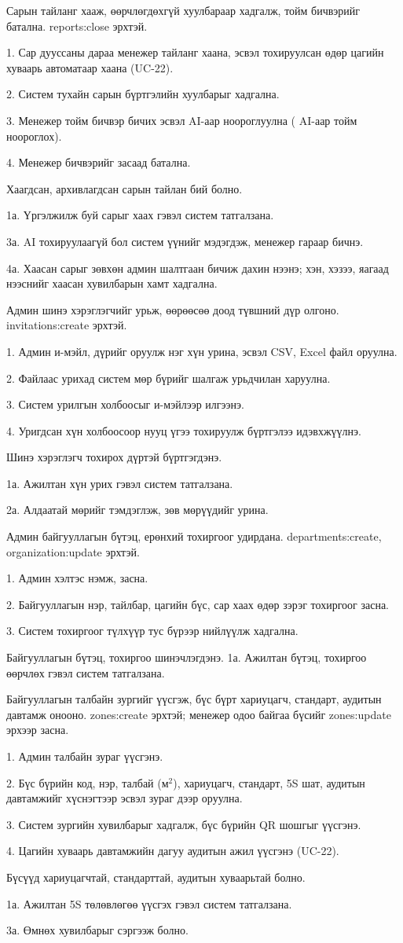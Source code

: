 {Сарын тайланг хааж, өөрчлөгдөхгүй хуулбараар хадгалж, тойм бичвэрийг батална.}
{reports:close эрхтэй.}
{1. Сар дууссаны дараа менежер тайланг хаана, эсвэл тохируулсан өдөр цагийн хуваарь автоматаар хаана (UC-22).\par
 2. Систем тухайн сарын бүртгэлийн хуулбарыг хадгална.\par
 3. Менежер тойм бичвэр бичих эсвэл AI-аар ноороглуулна ( AI-аар тойм ноороглох).\par
 4. Менежер бичвэрийг засаад батална.}
{Хаагдсан, архивлагдсан сарын тайлан бий болно.}
{1а. Үргэлжилж буй сарыг хаах гэвэл систем татгалзана.\par
 3а. AI тохируулаагүй бол систем үүнийг мэдэгдэж, менежер гараар бичнэ.\par
 4а. Хаасан сарыг зөвхөн админ шалтгаан бичиж дахин нээнэ; хэн, хэзээ, яагаад нээснийг хаасан хувилбарын хамт хадгална.}

{Админ шинэ хэрэглэгчийг урьж, өөрөөсөө доод түвшний дүр олгоно.}
{invitations:create эрхтэй.}
{1. Админ и-мэйл, дүрийг оруулж нэг хүн урина, эсвэл CSV, Excel файл оруулна.\par
 2. Файлаас урихад систем мөр бүрийг шалгаж урьдчилан харуулна.\par
 3. Систем урилгын холбоосыг и-мэйлээр илгээнэ.\par
 4. Уригдсан хүн холбоосоор нууц үгээ тохируулж бүртгэлээ идэвхжүүлнэ.}
{Шинэ хэрэглэгч тохирох дүртэй бүртгэгдэнэ.}
{1а. Ажилтан хүн урих гэвэл систем татгалзана.\par
 2а. Алдаатай мөрийг тэмдэглэж, зөв мөрүүдийг урина.}

{Админ байгууллагын бүтэц, ерөнхий тохиргоог удирдана.}
{departments:create, organization:update эрхтэй.}
{1. Админ хэлтэс нэмж, засна.\par
 2. Байгууллагын нэр, тайлбар, цагийн бүс, сар хаах өдөр зэрэг тохиргоог засна.\par
 3. Систем тохиргоог түлхүүр тус бүрээр нийлүүлж хадгална.}
{Байгууллагын бүтэц, тохиргоо шинэчлэгдэнэ.}
{1а. Ажилтан бүтэц, тохиргоо өөрчлөх гэвэл систем татгалзана.}

{Байгууллагын талбайн зургийг үүсгэж, бүс бүрт хариуцагч, стандарт, аудитын давтамж онооно.}
{zones:create эрхтэй; менежер одоо байгаа бүсийг zones:update эрхээр засна.}
{1. Админ талбайн зураг үүсгэнэ.\par
 2. Бүс бүрийн код, нэр, талбай (м$^2$), хариуцагч, стандарт, 5S шат, аудитын давтамжийг хүснэгтээр эсвэл зураг дээр оруулна.\par
 3. Систем зургийн хувилбарыг хадгалж, бүс бүрийн QR шошгыг үүсгэнэ.\par
 4. Цагийн хуваарь давтамжийн дагуу аудитын ажил үүсгэнэ (UC-22).}
{Бүсүүд хариуцагчтай, стандарттай, аудитын хуваарьтай болно.}
{1а. Ажилтан 5S төлөвлөгөө үүсгэх гэвэл систем татгалзана.\par
 3а. Өмнөх хувилбарыг сэргээж болно.}

